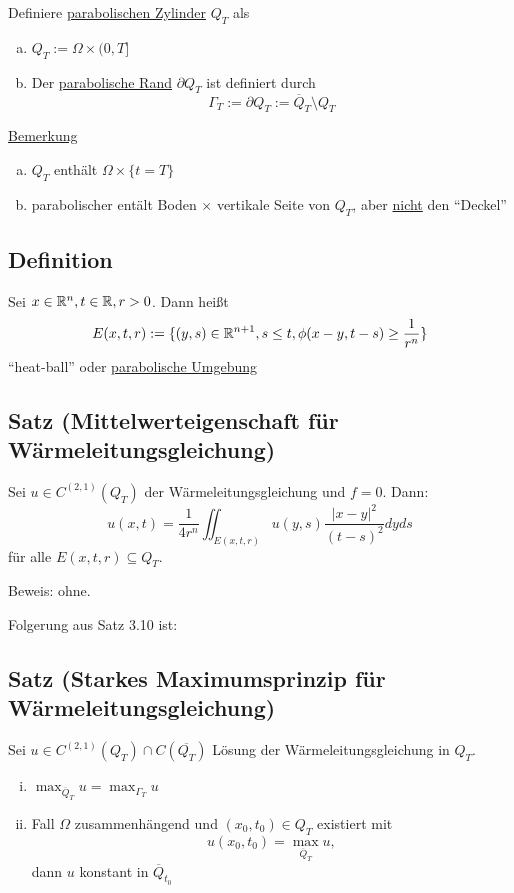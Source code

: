 Definiere \underline{parabolischen Zylinder} $Q_T$ als
\begin{enumerate}[a)]
  \item $Q_T := \Omega \times (0, T]$
  \item Der \underline{parabolische Rand} $\partial Q_T$ ist definiert durch
    $$
    \Gamma_T := \partial Q_T := \overline Q_T \setminus Q_T
    $$
\end{enumerate}

\underline{Bemerkung}
\begin{enumerate}[a)]
  \item $Q_T$ enthält $\Omega \times \{ t = T\}$
  \item parabolischer entält Boden $\times$ vertikale Seite von $Q_T$, aber \underline{nicht} den ``Deckel''
\end{enumerate}

\subsection{Definition}

Sei $x \in \mathbb{R}^n, t \in \mathbb{R}, r > 0$. Dann heißt
$$
E(x, t, r) := \{ (y, s) \in \mathbb{R}^{n + 1}, s \leq t, \phi(x - y, t- s) \geq \frac{1}{r^n} \}
$$
``heat-ball'' oder \underline{parabolische Umgebung}

\subsection{Satz (Mittelwerteigenschaft für Wärmeleitungsgleichung)}

Sei $u \in C^{(2,1)}(Q_T)$ der Wärmeleitungsgleichung und $f = 0$. 
Dann:
$$
u(x,t) = \frac{1}{4r^n} \iint_{E(x,t,r)} u(y,s) \frac{|x - y|^2}{(t - s)^2} dy ds
$$
für alle $E(x,t,r) \subseteq Q_T$.

Beweis: ohne.

Folgerung aus Satz 3.10 ist:

\subsection{Satz (Starkes Maximumsprinzip für Wärmeleitungsgleichung)}

Sei $u \in C^{(2,1)}(Q_T) \cap C(\overline{Q_T})$ Lösung der Wärmeleitungsgleichung in $Q_T$.
\begin{enumerate}[(i)]
  \item $\max_{\overline Q_T} u = \max_{\Gamma_T} u$
  \item Fall $\Omega$ zusammenhängend und $(x_0, t_0) \in Q_T$ existiert mit
    $$
    u(x_0, t_0) = \max_{\overline Q_T} u,
    $$
    dann $u$ konstant in $\overline Q_{t_0}$
\end{enumerate}

